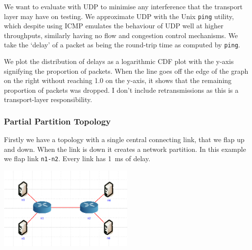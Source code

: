 \documentclass[10pt,twoside,a4paper]{article}
\begin{document}
We want to evaluate with UDP to minimise any interference that the transport layer may have on testing. We approximate UDP with the Unix \texttt{ping} utility, which despite using ICMP emulates the behaviour of UDP well at higher throughputs, similarly having no flow and congestion control mechanisms. We take the `delay' of a packet as being the round-trip time as computed by \texttt{ping}.

We plot the distribution of delays as a logarithmic CDF plot with the y-axis signifying the proportion of packets. When the line goes off the edge of the graph on the right without reaching 1.0 on the y-axis, it shows that the remaining proportion of packets was dropped. I don't include retransmissions as this is a transport-layer responsibility.

\subsubsection{Partial Partition Topology}

Firstly we have a topology with a single central connecting link, that we flap up and down. When the link is down it creates a network partition. In this example we flap link \texttt{n1-n2}. Every link has \SI{1}{\ms} of delay.

\begin{minipage}{1\textwidth} \centering
	\includegraphics[width=0.5\textwidth]{delay_partition_topology}
	\label{fig:partition_topology}
\end{minipage}
\end{document}
